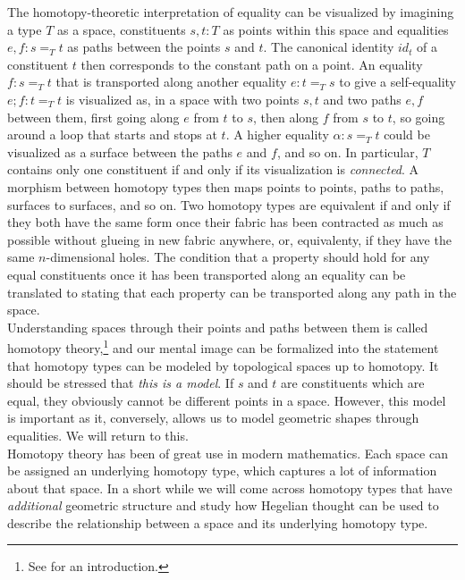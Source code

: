 \documentclass{article}
\begin{document}
The homotopy-theoretic interpretation of equality can be visualized by imagining a type $T$ as a space,
constituents $s,t:T$ as points within this space and equalities $e,f:s=_T t$ as paths between the points
$s$ and $t$. The canonical identity $id_t$ of a constituent $t$ then corresponds to the constant path
on a point. An equality $f:s =_T t$  that is transported along another equality $e:t =_T s$ to give a
self-equality $e;f:t=_T t$ is visualized as, in a space with two points $s,t$ and two paths $e,f$
between them, first going along $e$ from $t$ to $s$, then along $f$ from $s$ to $t$, so going around a
loop that starts and stops at $t$. A higher equality $\alpha:s=_T t$ could be visualized as a surface
between the paths $e$ and $f$, and so on. In particular, $T$ contains only one constituent if and only
if its visualization is \emph{connected}. A morphism between homotopy types then maps points to points,
paths to paths, surfaces to surfaces, and so on. Two homotopy types are equivalent if and only if they
both have the same form once their fabric has been contracted as much as possible without glueing in new
fabric anywhere, or, equivalenty, if they have the same $n$-dimensional holes. The condition that a property
should hold for any equal constituents once it has been transported along an equality can be translated
to stating that each property can be transported along any path in the space. \\

Understanding spaces through their points and paths between them is called homotopy theory,\footnote{See
\cite{Htt} for an introduction.} and our mental image can be formalized into the statement that homotopy
types can be modeled by topological spaces up to homotopy. It should be stressed that \emph{this is a
model}. If $s$ and $t$ are constituents which are equal, they obviously cannot be different points in
a space. However, this model is important as it, conversely, allows us to model geometric shapes through
equalities. We will return to this. \\

Homotopy theory has been of great use in modern mathematics. Each space can be assigned an underlying
homotopy type, which captures a lot of information about that space. In a short while we will come across
homotopy types that have \emph{additional} geometric structure and study how Hegelian thought can be used
to describe the relationship between a space and its underlying homotopy type. \\
\end{document}
